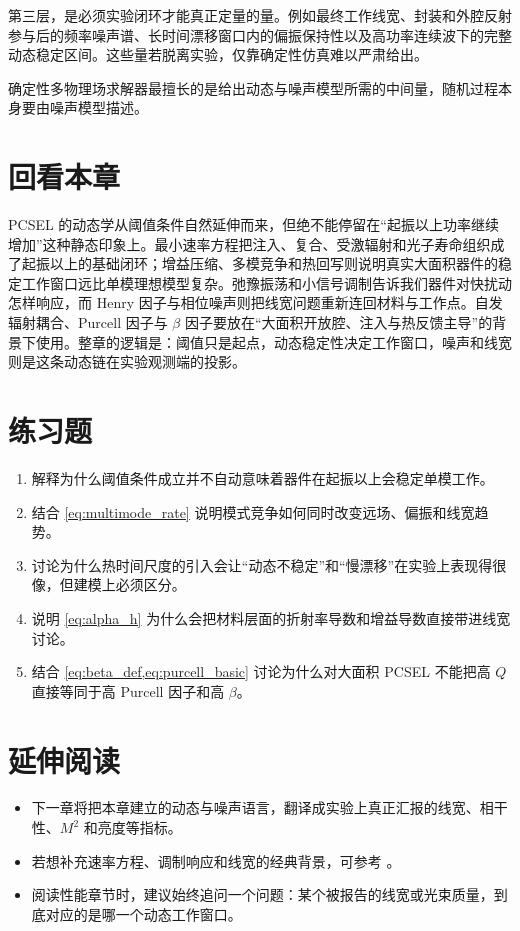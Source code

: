 第三层，是必须实验闭环才能真正定量的量。例如最终工作线宽、封装和外腔反射参与后的频率噪声谱、长时间漂移窗口内的偏振保持性以及高功率连续波下的完整动态稳定区间。这些量若脱离实验，仅靠确定性仿真难以严肃给出。

确定性多物理场求解器最擅长的是给出动态与噪声模型所需的中间量，随机过程本身要由噪声模型描述。

\section*{回看本章}
PCSEL 的动态学从阈值条件自然延伸而来，但绝不能停留在“起振以上功率继续增加”这种静态印象上。最小速率方程把注入、复合、受激辐射和光子寿命组织成了起振以上的基础闭环；增益压缩、多模竞争和热回写则说明真实大面积器件的稳定工作窗口远比单模理想模型复杂。弛豫振荡和小信号调制告诉我们器件对快扰动怎样响应，而 Henry 因子与相位噪声则把线宽问题重新连回材料与工作点。自发辐射耦合、Purcell 因子与 $\beta$ 因子要放在“大面积开放腔、注入与热反馈主导”的背景下使用。整章的逻辑是：阈值只是起点，动态稳定性决定工作窗口，噪声和线宽则是这条动态链在实验观测端的投影。

\section*{练习题}
\begin{enumerate}
  \item \basicq 解释为什么阈值条件成立并不自动意味着器件在起振以上会稳定单模工作。

  \item \basicq 结合 \cref{eq:multimode_rate} 说明模式竞争如何同时改变远场、偏振和线宽趋势。

  \item \midq 讨论为什么热时间尺度的引入会让“动态不稳定”和“慢漂移”在实验上表现得很像，但建模上必须区分。

  \item \midq 说明 \cref{eq:alpha_h} 为什么会把材料层面的折射率导数和增益导数直接带进线宽讨论。

  \item \hardq 结合 \cref{eq:beta_def,eq:purcell_basic} 讨论为什么对大面积 PCSEL 不能把高 $Q$ 直接等同于高 Purcell 因子和高 $\beta$。
\end{enumerate}

\section*{延伸阅读}
\begin{itemize}
  \item 下一章将把本章建立的动态与噪声语言，翻译成实验上真正汇报的线宽、相干性、$M^2$ 和亮度等指标。

  \item 若想补充速率方程、调制响应和线宽的经典背景，可参考 \cite{coldren2012,siegman1986,henry1982,itoh2020}。

  \item 阅读性能章节时，建议始终追问一个问题：某个被报告的线宽或光束质量，到底对应的是哪一个动态工作窗口。
\end{itemize}
